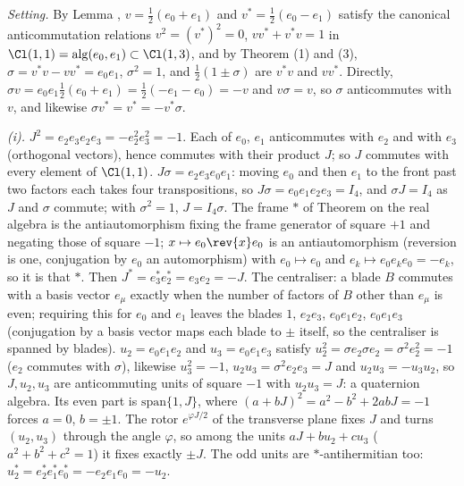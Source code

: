 \emph{Setting.} By Lemma , $v = \tfrac12(e_{0} + e_{1})$ and $v^{*} = \tfrac12(e_{0} - e_{1})$ satisfy the canonical anticommutation relations $v^{2} = (v^{*})^{2} = 0$, $vv^{*} + v^{*}v = 1$ in $\Cl(1,1) = \mathrm{alg}(e_{0}, e_{1}) \subset \Cl(1,3)$, and by Theorem (1) and (3), $\sigma = v^{*}v - vv^{*} = e_{0}e_{1}$, $\sigma^{2} = 1$, and $\tfrac12(1 \pm \sigma)$ are $v^{*}v$ and $vv^{*}$. Directly, $\sigma v = e_{0}e_{1}\tfrac12(e_{0} + e_{1}) = \tfrac12(-e_{1} - e_{0}) = -v$ and $v\sigma = v$, so $\sigma$ anticommutes with $v$, and likewise $\sigma v^{*} = v^{*} = -v^{*}\sigma$.

\emph{(i).} $J^{2} = e_{2}e_{3}e_{2}e_{3} = -e_{2}^{2}e_{3}^{2} = -1$. Each of $e_{0}$, $e_{1}$ anticommutes with $e_{2}$ and with $e_{3}$ (orthogonal vectors), hence commutes with their product $J$; so $J$ commutes with every element of $\Cl(1,1)$. $J\sigma = e_{2}e_{3}e_{0}e_{1}$: moving $e_{0}$ and then $e_{1}$ to the front past two factors each takes four transpositions, so $J\sigma = e_{0}e_{1}e_{2}e_{3} = I_{4}$, and $\sigma J = I_{4}$ as $J$ and $\sigma$ commute; with $\sigma^{2} = 1$, $J = I_{4}\sigma$. The frame $*$ of Theorem  on the real algebra is the antiautomorphism fixing the frame generator of square $+1$ and negating those of square $-1$; $x \mapsto e_{0}\rev{x}e_{0}$ is an antiautomorphism (reversion is one, conjugation by $e_{0}$ an automorphism) with $e_{0} \mapsto e_{0}$ and $e_{k} \mapsto e_{0}e_{k}e_{0} = -e_{k}$, so it is that $*$. Then $J^{*} = e_{3}^{*}e_{2}^{*} = e_{3}e_{2} = -J$. The centraliser: a blade $B$ commutes with a basis vector $e_{\mu}$ exactly when the number of factors of $B$ other than $e_{\mu}$ is even; requiring this for $e_{0}$ and $e_{1}$ leaves the blades $1$, $e_{2}e_{3}$, $e_{0}e_{1}e_{2}$, $e_{0}e_{1}e_{3}$ (conjugation by a basis vector maps each blade to $\pm$ itself, so the centraliser is spanned by blades). $u_{2} = e_{0}e_{1}e_{2}$ and $u_{3} = e_{0}e_{1}e_{3}$ satisfy $u_{2}^{2} = \sigma e_{2}\sigma e_{2} = \sigma^{2}e_{2}^{2} = -1$ ($e_{2}$ commutes with $\sigma$), likewise $u_{3}^{2} = -1$, $u_{2}u_{3} = \sigma^{2}e_{2}e_{3} = J$ and $u_{2}u_{3} = -u_{3}u_{2}$, so $J, u_{2}, u_{3}$ are anticommuting units of square $-1$ with $u_{2}u_{3} = J$: a quaternion algebra. Its even part is $\mathrm{span}\{1, J\}$, where $(a + bJ)^{2} = a^{2} - b^{2} + 2abJ = -1$ forces $a = 0$, $b = \pm 1$. The rotor $e^{\varphi J/2}$ of the transverse plane fixes $J$ and turns $(u_{2}, u_{3})$ through the angle $\varphi$, so among the units $aJ + bu_{2} + cu_{3}$ ($a^{2} + b^{2} + c^{2} = 1$) it fixes exactly $\pm J$. The odd units are $*$-antihermitian too: $u_{2}^{*} = e_{2}^{*}e_{1}^{*}e_{0}^{*} = -e_{2}e_{1}e_{0} = -u_{2}$.

